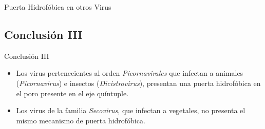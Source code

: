 \documentclass[8pt]{beamer}
\begin{document}
\begin{frame}{Puerta Hidrofóbica en otros Virus}
\begin{minipage}[t]{0.6\textwidth}
{}
\end{minipage}
\end{frame}

\subsection{Conclusión III}
\begin{frame}{Conclusión III}
\begin{itemize}
    \item Los virus pertenecientes al orden \textit{Picornavirales} que infectan a animales (\alert{\textit{Picornavirus}}) e insectos (\alert{\textit{Dicistrovirus}}), \alert{presentan una puerta hidrofóbica} en el poro presente en el eje quíntuple.\vfill
    \item Los virus de la familia \alert{\textit{Secovirus}}, que infectan a vegetales, \alert{no presenta el mismo mecanismo de puerta hidrofóbica}.
\end{itemize}
\end{frame}
\end{document}
